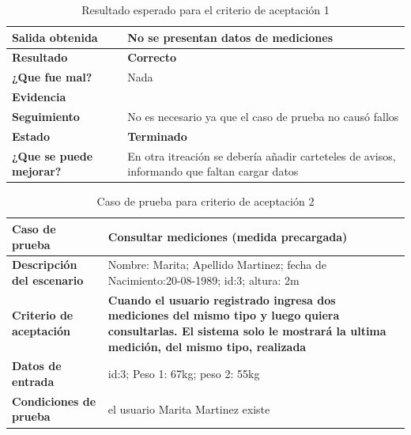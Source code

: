 \documentclass[a4paper,12pt]{article}
\begin{document}
        {\scriptsize
	\begin{table}[h]
	\centering
	\begin{tabular}{|l|p{10cm}|}
	    \hline 
	    \textbf{Salida obtenida}& No se presentan datos de mediciones\\ \hline
	    \textbf{Resultado}& \textbf{Correcto}\\ \hline
        \textbf{¿Que fue mal?}& Nada\\ \hline      
        \textbf{Evidencia}& \\ \hline
        \textbf{Seguimiento}&No es necesario ya que el caso de prueba no causó
fallos \\ \hline
        \textbf{Estado}& \textbf{Terminado}\\ \hline        
         \textbf{¿Que se puede mejorar?}& En otra itreación se debería añadir carteteles de avisos, informando que faltan cargar datos \\ \hline              
	    \end{tabular}
        \caption{Resultado esperado para el criterio de aceptación 1}
    	\end{table}
	}
\clearpage 

{\scriptsize
	\begin{table}[h]
	\centering
	\begin{tabular}{||l|p{9cm}||}
    	\rowcolor[gray]{0.9}
	    \hline 
        \hline 
	    \textbf{Caso de prueba}  &  \textbf{Consultar mediciones (medida precargada)}\\  \hline
	    \textbf{Descripción del escenario}& Nombre: Marita; Apellido Martinez; fecha de Nacimiento:20-08-1989; id:3; altura: 2m  \\ 			\hline
	    \textbf{Criterio de aceptación} &\textbf{ Cuando el usuario registrado ingresa dos mediciones del mismo tipo y luego quiera consultarlas. El sistema solo le mostrará la ultima medición, del mismo tipo, realizada} \\ \hline
        \textbf{Datos de entrada}& id:3; Peso 1: 67kg; peso 2: 55kg \\ \hline
        \textbf{Condiciones de  prueba}& el usuario Marita Martinez existe \\ \hline 			\hline
	    \end{tabular}
        \caption{Caso de prueba para criterio de aceptación 2}        
	    \end{table}
}
 
\end{document}
